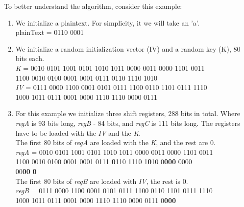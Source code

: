 To better understand the algorithm, consider this example:
\begin{enumerate}
	\setlength\itemsep{0.1em}
	\item We initialize a plaintext. For simplicity, it we will take an 'a'.\\
	{\selectfont
		plainText = 0110 0001
	}
	
	
	\item We initialize a random initialization vector (IV) and a random key (K), 80 bits each.\\
	{\selectfont
		\emph{K} = 0010 0101 1001 0101 1010 1011 0000 0011 0000 1101 0011\\
		\indent\hspace{1cm}1100 0010 0100 0001 0001 0111 0110 1110 1010
	}
	\vspace{0.5em}
	\\
	{\selectfont
		\emph{IV} = 0111 0000 1100 0001 0101 0111 1100 0110 1101 0111 1110\\ 
		\indent\hspace{1.2cm}1000 1011 0111 0001 0000 1110 1110 0000 0111
	}
	
	\item For this example we initialize three shift registers, 288 bits in total. Where \emph{regA} is 93 bits long, \emph{regB} - 84 bits, and \emph{regC} is 111 bits long. The registers have to be loaded with the \emph{IV} and the \emph{K}. \\
	The first 80 bits of \emph{regA} are loaded with the \emph{K}, and the rest are 0. 
	\vspace{0.5em}
	\\
	{\selectfont
		\emph{regA} = 0010 0101 1001 0101 1010 1011 0000 0011 0000 1101 0011 \\ 
		\indent\hspace{1.6cm}1100 0010 0100 0001 0001 0111 \textbf{0}110 1110 1\textbf{0}10 0\textbf{000}  0000\\
		\indent\hspace{1.6cm}00\textbf{00} \textbf{0}
	}
	\vspace{0.5em}
	\\
	The first 80 bits of \emph{regB} are loaded with \emph{IV}, the rest is 0. \\
	{\selectfont
		\emph{regB} = 0111 0000 1100 0001 0101 0111 1100 0110 1101 0111 1110 \\ 
		\indent\hspace{1.6cm}1000 1011 0111 0001 0000 1\textbf{1}10 \textbf{1}110 0000 0111 0\textbf{000}
	}
	

\end{enumerate}
